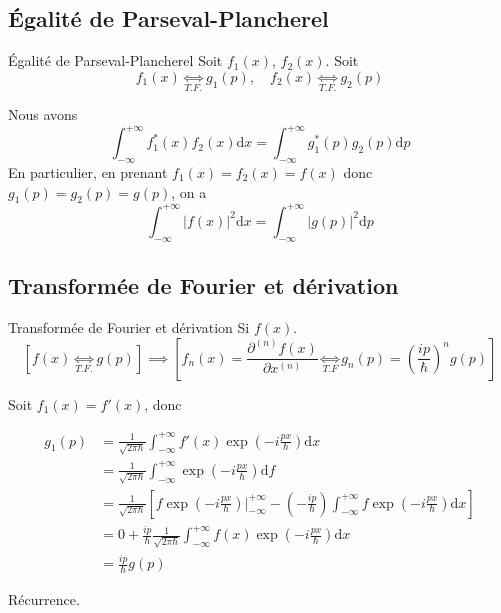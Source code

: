 \subsection{Égalité de Parseval-Plancherel} %
\label{sub:Égalité de Parseval-Plancherel}

\begin{Prop}{Égalité de Parseval-Plancherel}{}
Soit $f_1(x)$, $f_2(x)$. Soit 
\[
  f_1(x) \underset{T.F.}{\iff} g_1(p), \quad f_2(x) \underset{T.F.}{\iff} g_2(p)
\]

Nous avons 
\begin{equation}
  \boxed{\displaystyle\int_{- \infty}^{+ \infty} f_1 ^{*}(x) f_2(x) \mathrm{d} x = \displaystyle\int_{- \infty}^{+ \infty} g_1 ^{*}(p) g_2(p) \mathrm{d} p}
  \label{eq:Parseval-Plancherel}
\end{equation}
En particulier, en prenant $f_1(x) = f_2(x) = f(x)$ donc $g_1(p) = g_2(p) = g(p)$, on a 
\[
  \int_{- \infty}^{ + \infty} |f(x)| ^{2} \mathrm{d} x = \int_{- \infty}^{ + \infty} |g(p)| ^{2} \mathrm{d} p
\]
\end{Prop}
 
\subsection{Transformée de Fourier et dérivation} %

\begin{Prop}{Transformée de Fourier et dérivation}{}
Si $f(x)$. 
\begin{equation}
  \left[ f(x) \underset{T.F.}{\iff} g(p) \right] \implies \left[  f_n(x) = \frac{\partial ^{(n) }f(x)}{\partial x ^{(n)}} \underset{T.F}{\iff} g_n(p) = \left( \frac{ip}{\hbar}  \right) ^{n} g(p)
 \right] \label{eq:2}
\end{equation}
\end{Prop}

\begin{myproof}{}{}
Soit $f_1(x) = f'(x)$, donc 

\begin{align*}
  g_1(p) &= \frac{1}{\sqrt{2 \pi \hbar}}  \displaystyle\int_{- \infty}^{+\infty} f'(x) \exp(-i \frac{p x}{\hbar} ) \mathrm{d}x \\
         &= \frac{1}{\sqrt{2 \pi \hbar}}  \displaystyle\int_{- \infty}^{+\infty}  \exp(-i \frac{p x}{\hbar} ) \mathrm{d}f \\
         &= \frac{1}{\sqrt{2 \pi \hbar}}  \left[ f \exp\left( - i \frac{p x}{\hbar} \right)| _{- \infty} ^{+ \infty} - \left( - \frac{ip}{\hbar}  \right) \int_{- \infty}^{+\infty} f \exp \left( - i \frac{p x}{\hbar}  \right)\mathrm{d}x\right] \\ 
         &= 0 +  \frac{i p }{\hbar}  \frac{1}{\sqrt{2 \pi \hbar}} \int_{- \infty}^{+\infty} f(x) \exp \left( -i \frac{p x}{\hbar}  \right) \mathrm{d} x \\ 
         &= \frac{ip}{\hbar}  g(p)
\end{align*}

Récurrence.
\end{myproof}

